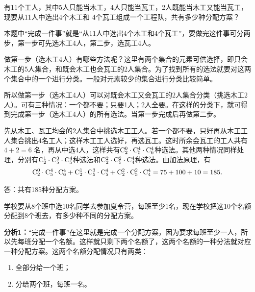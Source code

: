 \begin{example}
     有11个工人，其中5人只能当木工，4人只能当瓦工，2人既能当木工又能当瓦工，现要从11人中选出4个木工和 4个瓦工组成一个工程队，共有多少种分配方案？
\end{example}

\begin{analyze}
    本题中“完成一件事”就是“从11人中选出4个木工和4个瓦工”，要做完这件事可分两步，第一步可先选木工4人，第二步，选瓦工4人。

做第一步（选木工4人）有哪些方法呢？这里有两个集合的元素可供选择，即只会木工的5人集合，和既会木工也会瓦工的2人集合。为了找到所有的选法就要对这两个集合中的一个进行分类。一般对元素较少的集合进行分类比较简单。

所以做第一步（选木工4人）可以对既会木工又会瓦工的2人集合分类（挑选木工2人）。可有三种情况：一个都不要；只要1人；2人全要。在这样的分类下，就可得到完成第一步（选木工4人）的所有选法。当第一步完成后再做第二步。
\end{analyze}

\begin{solution}
 先从木工、瓦工均会的2人集合中挑选木工工人。若一个都不要，只好再从木工工人集合挑出4名工人；这样木工工人选好，再选瓦工。这时所余会瓦工的工人共有$4+ 2=6$ 名，再从中选4人，这样共有$ \comb{2}{0}\cdot  \comb{5}{4}\cdot  \comb{6}{4} $种选法。其他两种情况同样处理，分别有$ \comb{2}{1}\cdot  \comb{5}{3}\cdot  \comb{5}{4} $种选法和$ \comb{2}{2}\cdot  \comb{5}{2}\cdot  \comb{4}{4} $种选法。由加法原理，有
\[
\comb{2}{0}\cdot  \comb{5}{4}\cdot  \comb{6}{4}+\comb{2}{1}\cdot  \comb{5}{3}\cdot  \comb{5}{4}+\comb{2}{2}\cdot  \comb{5}{2}\cdot  \comb{4}{4}=75+100+10=185.\]

答：共有185种分配方案。   
\end{solution}

\begin{example}
    学校要从8个班中选10名同学去参加夏令营，每班至少1名，现在学校把这10个名额分配到8个班去，有多少种不同的分配方案。
\end{example}

\textbf{分析1：}“完成一件事”在这里就是完成一个分配方案，因为要求每班至少一人，所以先每班分配一个名额。这样就只剩下两个名额了，这两个名额的一种分法就对应一种分配方案。这两个名额分配情况只有两类：
\begin{enumerate}[(1)]
    \item 全部分给一个班；
    \item 分给两个班，每班一名。
\end{enumerate}

